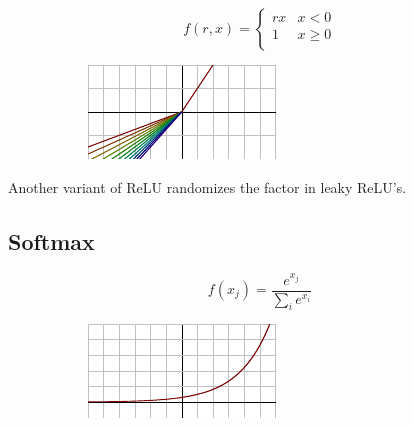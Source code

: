 \begin{figure}[H]
\raggedright
\begin{subfigure}{.35\textwidth}
  \centering
  \[
f(r, x) = \begin{cases}
       rx & x < 0 \\
       1 & x \geq 0 \\
     \end{cases} \] 
\end{subfigure}%
\begin{subfigure}{.25\textwidth}
  \centering
  \includegraphics[width=\textwidth]{tex/images/activation/rlrelu}
\end{subfigure}
\end{figure}

\noindent
Another variant of ReLU randomizes the factor in leaky ReLU's.

\subsection*{Softmax}
\label{subsection:softmax}

\begin{figure}[H]
\raggedright
\begin{subfigure}{.25\textwidth}
  \centering
  \[ f(x_j) = \frac{e^{x_j}}{\sum_i e^{x_i}} \]
\end{subfigure}%
\begin{subfigure}{.25\textwidth}
  \centering
  \includegraphics[width=\textwidth]{tex/images/activation/softmax}
\end{subfigure}
\end{figure}

